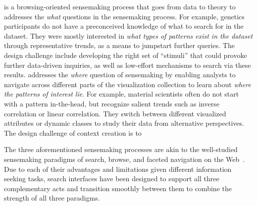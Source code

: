  is
a browsing-oriented sensemaking process
that goes from data to theory to
addresses the \textit{what} questions
in the sensemaking process.
 For example, genetics participants do not
 have a preconceived knowledge of what to search
 for in the dataset.
 They were mostly interested in
 \textit{what types of patterns exist in the dataset}
 through representative trends, as a means to
 jumpstart further queries. %
The design challenge include developing
the right set of ``stimuli'' that could
provoke further data-driven inquiries,
as well as low-effort mechanisms to search via these results.
 addresses the \textit{where}
question of sensemaking by enabling analysts
to navigate across different parts of the visualization
collection to learn about \textit{where  the patterns of interest lie}.
For example, material scientists often do not start
with a pattern in-the-head, but recognize salient
trends such as inverse correlation or linear correlation.
They switch between different visualized attributes or dynamic
classes to study their data from alternative perspectives.
The design challenge of context creation is to 
\par\noindent The three aforementioned sensemaking processes are akin to the well-studied sensemaking paradigms of search, browse, and faceted navigation on the Web~\cite{Hearst2009,Olston2003}. Due to each of their advantages and limitations given different information seeking tasks, search interfaces have been designed to support all three complementary acts and transition smoothly between them to combine the strength of all three paradigms. 
